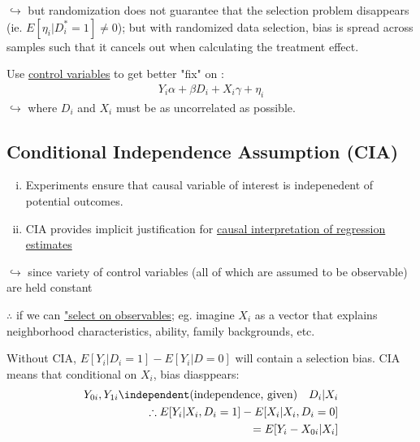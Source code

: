 \noindent $\hookrightarrow$ but randomization does not guarantee that the selection problem disappears (ie. $E[\eta_{i}|D_{i}^{*}=1] \neq 0$); but with randomized data selection, bias is spread across samples such that it cancels out when calculating the treatment effect.

\vspace{4 mm}

\noindent Use \underline{control variables} to get better "fix" on \beta:
\begin{eqnarray}
Y_{i} \alpha + \beta D_{i} + X_{i}\gamma + \eta_{i} 
\end{eqnarray}
$\hookrightarrow$ where $D_{i}$ and $X_{i}$ must be as uncorrelated as possible.


\subsection{Conditional Independence Assumption (CIA)}
\begin{enumerate}[(i)]
\item Experiments ensure that causal variable of interest is indepenedent of potential outcomes.
\item CIA provides implicit justification for \underline{causal interpretation of regression estimates}
\end{enumerate}

\noindent $\hookrightarrow$ since variety of control variables (all of which are assumed to be observable) are held constant

\vspace{4 mm}

\noindent $\therefore$ if we can \underline{"select on observables}; eg. imagine $X_{i}$ as a vector that explains neighborhood characteristics, ability, family backgrounds, etc.

\vspace{4 mm}

Without CIA, $E[Y_{i}|D_{i}=1] - E[Y_{i}|D=0]$ will contain a selection bias.  CIA means that conditional on $X_{i}$, bias diasppears:
\begin{eqnarray}
{Y_{0i}, Y_{1i}} \independent \text{(independence, given)} \quad D_{i}|X_{i}
\nonumber \\
\therefore E[Y_{i}|X_{i},D_{i} =1] - E[X_{i}|X_{i}, D_{i}=0] \\
= E[Y_{i} - X_{0i}|X_{i}]
\end{eqnarray}

